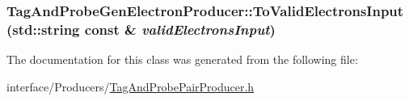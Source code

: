 \hypertarget{classTagAndProbeGenElectronProducer_a364d8f75510c1453409c70309a437417}{
\subsubsection[{ToValidElectronsInput}]{ TagAndProbeGenElectronProducer::ToValidElectronsInput (std::string const \& {\em validElectronsInput})}}
\label{classTagAndProbeGenElectronProducer_a364d8f75510c1453409c70309a437417}


The documentation for this class was generated from the following file:\begin{DoxyCompactItemize}
\item 
interface/Producers/\hyperlink{TagAndProbePairProducer_8h}{TagAndProbePairProducer.h}\end{DoxyCompactItemize}
